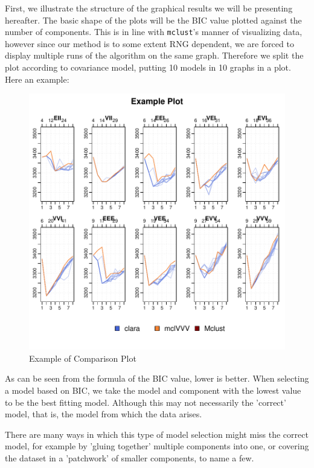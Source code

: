 First, we illustrate the structure of the graphical results we will be 
presenting hereafter. The basic shape of the plots will be the BIC value 
plotted against the number of components. This is in line with {\tt mclust}'s
manner of visualizing data, however since our method is to some extent RNG 
dependent, we are forced to display multiple runs of the algorithm on the same
graph. Therefore we split the plot according to covariance model, putting 10
models in 10 graphs in a plot. Here an example:


\begin{figure}[h!]
    \centering
\includegraphics{chapter3-bicplotdemoplot}
    \caption{Example of Comparison Plot}
    \label{fig:ExPlot}
\end{figure}

As can be seen from the formula of the BIC value, lower is better. When 
selecting a model based on BIC, we take the model and component with the 
lowest value to be the best fitting model. Although this may not necessarily
the 'correct' model, that is, the model from which the data arises.

There are many ways in which this type of model selection might miss the 
correct model, for example by 'gluing together' multiple components into one,
or covering the dataset in a 'patchwork' of smaller components, to name a few.

